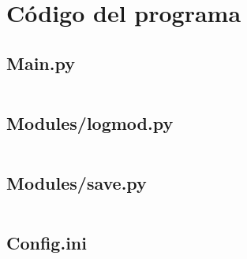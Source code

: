 \chapter{Código del programa}
\newcommand{\ipm}[1]{
	\section{#1}
	\label{#1}
	\inputminted[baselinestretch=1,
	fontsize=\scriptsize,
	linenos,
	breaklines
	]{python3}{Codigo/#1}
	\newpage{}
}

\ipm{Main.py}
\ipm{Modules/logmod.py}
\ipm{Modules/save.py}
\ipm{Config.ini}

